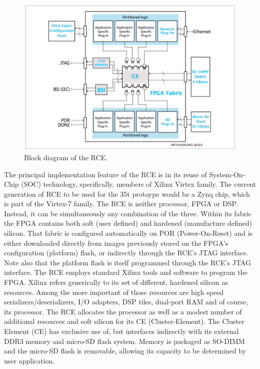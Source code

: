 \begin{figure}[tbh]
\includegraphics[scale=0.8]{rce-block.pdf}
\caption{Block diagram of the RCE.}
\label{fig:RCEblock}
\end{figure} 

The principal implementation feature of the RCE is in its reuse 
of System-On-Chip (SOC) technology, specifically, members of 
Xilinx Virtex family.
The current generation of RCE to be used for the 35t protoype would be 
a Zynq chip, which is part of the Virtex-7 family. 
The RCE is neither processor, FPGA or DSP. 
Instead, it can be simultaneously any combination of the three. 
Within its fabric the FPGA contains both soft (user defined) 
and hardened (manufacture defined) silicon. 
That fabric is configured automatically on POR (Power-On-Reset) 
and is either downloaded directly from images previously stored on the 
FPGA's configuration (platform) flash, or indirectly through the RCE's JTAG interface.
Note also that the platform flash is itself programmed through the RCE's 
JTAG interface. 
The RCE employs standard Xilinx tools and software to program the FPGA.
Xilinx refers generically to its set of different, hardened silicon as resources. 
Among the more important of those resources are high speed serializers/deserializers,
 I/O adapters, DSP tiles, dual-port RAM and of course, its processor. 
The RCE allocates the processor as well as a modest number of additional
 resources and soft silicon for its CE (Cluster-Element). 
The Cluster Element (CE) has exclusive use of, but interfaces indirectly with its external
DDR3 memory and micro-SD flash system. 
Memory is packaged as SO-DIMM and the micro-SD flash is removable, 
allowing its capacity to be determined by user application.

